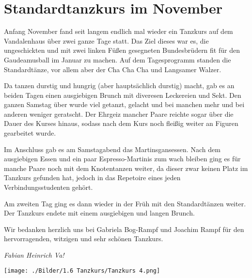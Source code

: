 \section{Standardtanzkurs im November}

\begin{multicols}{2}
Anfang November fand seit langem endlich mal wieder ein Tanzkurs auf dem Vandalenhaus über zwei ganze Tage statt.  Das Ziel dieses war es, die ungeschickten und mit zwei linken Füßen gesegneten Bundesbrüdern fit für den Gaudeamusball im Januar zu machen. Auf dem Tagesprogramm standen die Standardtänze, vor allem aber der Cha Cha Cha und Langsamer Walzer.

Da tanzen durstig und hungrig (aber hauptsächlich durstig) macht, gab es an beiden Tagen einen ausgiebigen Brunch mit diveresen Leckereien und Sekt. 
Den ganzen Samstag über wurde viel getanzt, gelacht und bei manchen mehr und bei anderen weniger geratscht.
Der Ehrgeiz mancher Paare reichte sogar über die Dauer des Kurses hinaus, sodass nach dem Kurs noch fleißig weiter an Figuren gearbeitet wurde.

Im Anschluss gab es am Samstagabend das Martinsgansessen. Nach dem ausgiebigen Essen und ein paar Espresso-Martinis zum wach bleiben ging es für manche Paare noch mit dem Knotentanzen weiter, da dieser zwar keinen Platz im Tanzkurs gefunden hat, jedoch in das Repetoire eines jeden Verbindungsstudenten gehört.

Am zweiten Tag ging es dann wieder in der Früh mit den Standardtänzen weiter.
Der Tanzkurs endete mit einem ausgiebigen und langen Brunch.

Wir bedanken herzlich uns bei Gabriela Bog-Rampf und Joachim Rampf für den hervorragenden, witzigen und sehr schönen Tanzkurs.

	\begin{flushright}
		\hfill\emph{Fabian Heinrich Va!}
	\end{flushright}
\end{multicols}


\begin{center}
\begin{figurehere}\texttt{[image: ./Bilder/1.6 Tanzkurs/Tanzkurs 4.png]} 
\end{figurehere}
\end{center}	
	
